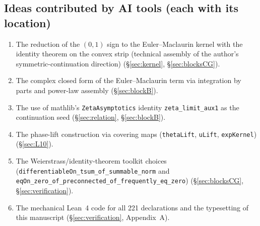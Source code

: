 \documentclass{article}
\begin{document}
\subsection*{Ideas contributed by AI tools (each with its location)}
\begin{enumerate}
\item The reduction of the $(0,1)$ sign to the Euler--Maclaurin kernel with
the identity theorem on the convex strip (technical assembly of the
author's symmetric-continuation direction) (\S\ref{sec:kernel},
\S\ref{sec:blocksCG}).
\item The complex closed form of the Euler--Maclaurin term via integration
by parts and power-law assembly (\S\ref{sec:blockB}).
\item The use of mathlib's \texttt{ZetaAsymptotics} identity
\texttt{zeta\_limit\_aux1} as the continuation seed (\S\ref{sec:relation},
\S\ref{sec:blockB}).
\item The phase-lift construction via covering maps
(\texttt{thetaLift}, \texttt{uLift}, \texttt{expKernel})
(\S\ref{sec:L10}).
\item The Weierstrass/identity-theorem toolkit choices
(\texttt{differentiableOn\_tsum\_of\_summable\_norm} and
\texttt{eqOn\_zero\_of\_preconnected\_of\_frequently\_eq\_zero})
(\S\ref{sec:blocksCG}, \S\ref{sec:verification}).
\item The mechanical Lean~4 code for all 221 declarations and the
typesetting of this manuscript (\S\ref{sec:verification}, Appendix~A).
\end{enumerate}
\end{document}
